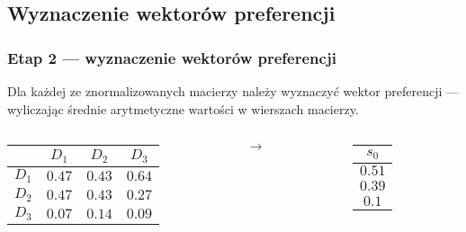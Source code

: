 \documentclass{beamer}
\begin{document}
\subsection{Wyznaczenie wektorów preferencji}
\begin{frame}
\frametitle{Etap 2 --- wyznaczenie wektorów preferencji}
Dla każdej ze znormalizowanych macierzy należy wyznaczyć wektor preferencji --- wyliczając średnie arytmetyczne wartości w wierszach macierzy.
	\begin{columns}
		\begin{column}{0.4\textwidth}
			\begin{table}
				\begin{tabular}{c|c|c|c}
					&	$D_1$	&	$D_2$	&	$D_3$\\ \hline
				$D_1$	&	$0.47$	&	$0.43$	&	$0.64$\\ \hline
				$D_2$	&	$0.47$	&	$0.43$	&	$0.27$\\ \hline
				$D_3$	&	$0.07$	&	$0.14$	&	$0.09$
				\end{tabular}
			\end{table}
		\end{column}
		\begin{column}{0.1\textwidth}
			$\rightarrow$
		\end{column}
		\begin{column}{0.1\textwidth}
			\begin{table}
				\begin{tabular}{c}
				$s_0$\\ \hline
				$0.51$\\
				$0.39$\\
				$0.1$
				\end{tabular}
			\end{table}
		\end{column}
	\end{columns}
\end{frame}
\end{document}
